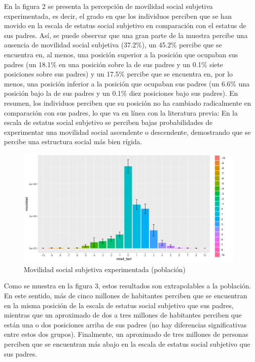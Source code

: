 \documentclass[
]{article}
\begin{document}
En la figura 2 se presenta la percepción de movilidad social subjetiva
experimentada, es decir, el grado en que los individuos perciben que se
han movido en la escala de estatus social subjetivo en comparación con
el estatus de sus padres. Así, se puede observar que una gran parte de
la muestra percibe una ausencia de movilidad social subjetiva (37.2\%),
un 45.2\% percibe que se encuentra en, al menos, una posición superior a
la posición que ocupaban sus padres (un 18.1\% en una posición sobre la
de sus padres y un 0.1\% siete posiciones sobre sus padres) y un 17.5\%
percibe que se encuentra en, por lo menos, una posición inferior a la
posición que ocupaban sus padres (un 6.6\% una posición bajo la de sus
padres y un 0.1\% diez posiciones bajo sus padres). En resumen, los
individuos perciben que su posición no ha cambiado radicalmente en
comparación con sus padres, lo que va en línea con la literatura previa:
En la escala de estatus social subjetivo se perciben bajas
probabilidades de experimentar una movilidad social ascendente o
descendente, demostrando que se percibe una estructura social más bien
rígida.

\begin{figure}

{\centering \includegraphics[width=0.8\linewidth,height=0.8\textheight]{output/graphs/graf1_exp} 

}

\caption{Movilidad social subjetiva experimentada (población)}\label{fig:unnamed-chunk-8}
\end{figure}

Como se muestra en la figura 3, estos resultados son extrapolables a la
población. En este sentido, más de cinco millones de habitantes perciben
que se encuentran en la misma posición de la escala de estatus social
subjetivo que sus padres, mientras que un aproximado de dos a tres
millones de habitantes perciben que están una o dos posiciones arriba de
sus padres (no hay diferencias significativas entre estos dos grupos).
Finalmente, un aproximado de tres millones de personas perciben que se
encuentran más abajo en la escala de estatus social subjetivo que sus
padres.
\end{document}
